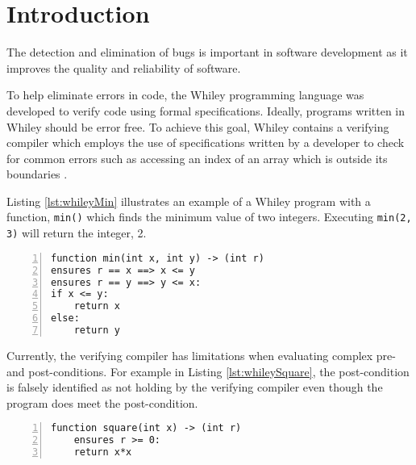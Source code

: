\chapter{Introduction}\label{chapter:intro}



The detection and elimination of bugs is important in software development as it improves the quality and reliability of software.

To help eliminate errors in code, the Whiley programming language was developed to verify code using formal specifications.
Ideally, programs written in Whiley should be error free.
To achieve this goal, Whiley contains a verifying compiler which employs the use of specifications written by a developer to check for common errors such as accessing an index of an array which is outside its boundaries \cite{WhileyLang}.

Listing \ref{lst:whileyMin} illustrates an example of a Whiley program with a function,  \texttt{min()} which finds the minimum value of two integers. Executing \texttt{min(2, 3)} will return the integer, 2.

\begin{lstlisting}[language=Whiley, tabsize=3, numbers=left,
label={lst:whileyMin}, caption={Whiley program for the min function}]
function min(int x, int y) -> (int r)
ensures r == x ==> x <= y
ensures r == y ==> y <= x:
if x <= y:
	return x
else:
	return y
\end{lstlisting}

Currently, the verifying compiler has limitations when evaluating complex pre- and post-conditions.
For example in Listing \ref{lst:whileySquare}, the post-condition is falsely identified as not holding by the verifying compiler even though the program does meet the post-condition.

\begin{lstlisting}[language=Whiley, tabsize=3, numbers=left,
label={lst:whileySquare}, caption={Whiley program for the square function}]
function square(int x) -> (int r)
	ensures r >= 0:
	return x*x
\end{lstlisting}

